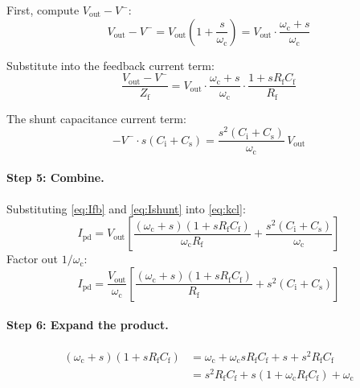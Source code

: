 \documentclass[a4paper,11pt]{article}
\begin{document}
First, compute $V_{\mathrm{out}} - V^-$:
\begin{equation}
  V_{\mathrm{out}} - V^{-}
  = V_{\mathrm{out}}\!\left(1 + \frac{s}{\omega_{\mathrm{c}}}\right)
  = V_{\mathrm{out}} \cdot
    \frac{\omega_{\mathrm{c}} + s}{\omega_{\mathrm{c}}}
  \label{eq:Vdiff}
\end{equation}

Substitute into the feedback current term:
\begin{equation}
  \frac{V_{\mathrm{out}} - V^{-}}{Z_{\mathrm{f}}}
  = V_{\mathrm{out}} \cdot
    \frac{\omega_{\mathrm{c}} + s}{\omega_{\mathrm{c}}} \cdot
    \frac{1 + sR_{\mathrm{f}}C_{\mathrm{f}}}{R_{\mathrm{f}}}
  \label{eq:Ifb}
\end{equation}

The shunt capacitance current term:
\begin{equation}
  -V^{-} \cdot s(C_{\mathrm{i}} + C_{\mathrm{s}})
  = \frac{s^2(C_{\mathrm{i}} + C_{\mathrm{s}})}{\omega_{\mathrm{c}}}
    \,V_{\mathrm{out}}
  \label{eq:Ishunt}
\end{equation}

\paragraph{Step 5: Combine.}

Substituting \eqref{eq:Ifb} and \eqref{eq:Ishunt} into
\eqref{eq:kcl}:
\begin{equation*}
  I_{\mathrm{pd}}
  = V_{\mathrm{out}} \left[
    \frac{(\omega_{\mathrm{c}} + s)
          (1 + sR_{\mathrm{f}}C_{\mathrm{f}})}
         {\omega_{\mathrm{c}} R_{\mathrm{f}}}
    + \frac{s^2(C_{\mathrm{i}} + C_{\mathrm{s}})}{\omega_{\mathrm{c}}}
  \right]
\end{equation*}
Factor out $1/\omega_{\mathrm{c}}$:
\begin{equation}
  I_{\mathrm{pd}}
  = \frac{V_{\mathrm{out}}}{\omega_{\mathrm{c}}} \left[
    \frac{(\omega_{\mathrm{c}} + s)
          (1 + sR_{\mathrm{f}}C_{\mathrm{f}})}
         {R_{\mathrm{f}}}
    + s^2(C_{\mathrm{i}} + C_{\mathrm{s}})
  \right]
  \label{eq:Ipd-combined}
\end{equation}

\paragraph{Step 6: Expand the product.}

\begin{align*}
  (\omega_{\mathrm{c}} + s)(1 + sR_{\mathrm{f}}C_{\mathrm{f}})
  &= \omega_{\mathrm{c}}
   + \omega_{\mathrm{c}} s R_{\mathrm{f}} C_{\mathrm{f}}
   + s + s^2 R_{\mathrm{f}} C_{\mathrm{f}} \\
  &= s^2 R_{\mathrm{f}} C_{\mathrm{f}}
   + s(1 + \omega_{\mathrm{c}} R_{\mathrm{f}} C_{\mathrm{f}})
   + \omega_{\mathrm{c}}
\end{align*}
\end{document}
